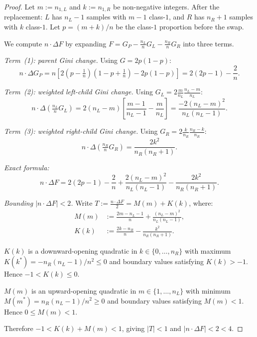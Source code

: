 \documentclass{article}
\begin{document}
\begin{proof}
Let $m := n_{1,L}$ and $k := n_{1,R}$ be non-negative integers.
After the replacement: $L$ has $n_L-1$ samples with $m-1$ class-$1$,
and $R$ has $n_R+1$ samples with $k$ class-$1$.
Let $p = (m+k)/n$ be the class-$1$ proportion before the swap.

We compute $n\cdot\Delta F$ by expanding
$F = G_P - \frac{n_L}{n}G_L - \frac{n_R}{n}G_R$ into three terms.

\textit{Term~(1): parent Gini change.}
Using $G = 2p(1-p)$:
\[
  n\cdot\Delta G_P
  = n\!\left[2\!\left(p-\tfrac{1}{n}\right)\!\left(1-p+\tfrac{1}{n}\right) - 2p(1-p)\right]
  = 2(2p-1) - \frac{2}{n}.
\]

\textit{Term~(2): weighted left-child Gini change.}
Using $G_L = 2\frac{m}{n_L}\frac{n_L-m}{n_L}$:
\[
  n\cdot\Delta\!\left(\tfrac{n_L}{n}G_L\right)
  = 2(n_L-m)\!\left[\frac{m-1}{n_L-1} - \frac{m}{n_L}\right]
  = \frac{-2(n_L-m)^2}{n_L(n_L-1)}.
\]

\textit{Term~(3): weighted right-child Gini change.}
Using $G_R = 2\frac{k}{n_R}\frac{n_R-k}{n_R}$:
\[
  n\cdot\Delta\!\left(\tfrac{n_R}{n}G_R\right) = \frac{2k^2}{n_R(n_R+1)}.
\]

\textit{Exact formula:}
\begin{equation}
  n\cdot\Delta F
  = 2(2p-1) - \frac{2}{n}
    + \frac{2(n_L-m)^2}{n_L(n_L-1)}
    - \frac{2k^2}{n_R(n_R+1)}.
  \label{eq:caseB-exact}
\end{equation}

\textit{Bounding $|n\cdot\Delta F| < 2$.}
Write $T := \frac{n\cdot\Delta F}{2} = M(m) + K(k)$, where:
\begin{align}
  M(m) &:= \frac{2m-n_L-1}{n} + \frac{(n_L-m)^2}{n_L(n_L-1)}, \\
  K(k) &:= \frac{2k-n_R}{n} - \frac{k^2}{n_R(n_R+1)}.
\end{align}

$K(k)$ is a downward-opening quadratic in $k \in \{0,\ldots,n_R\}$
with maximum $K(k^*) = -n_R(n_L-1)/n^2 \leq 0$ and boundary values
satisfying $K(k) > -1$. Hence $-1 < K(k) \leq 0$.

$M(m)$ is an upward-opening quadratic in $m \in \{1,\ldots,n_L\}$
with minimum $M(m^*) = n_R(n_L-1)/n^2 \geq 0$ and boundary values
satisfying $M(m) < 1$. Hence $0 \leq M(m) < 1$.

Therefore $-1 < K(k) + M(m) < 1$, giving
$|T| < 1$ and $|n\cdot\Delta F| < 2 < 4$.
\end{proof}
\end{document}
